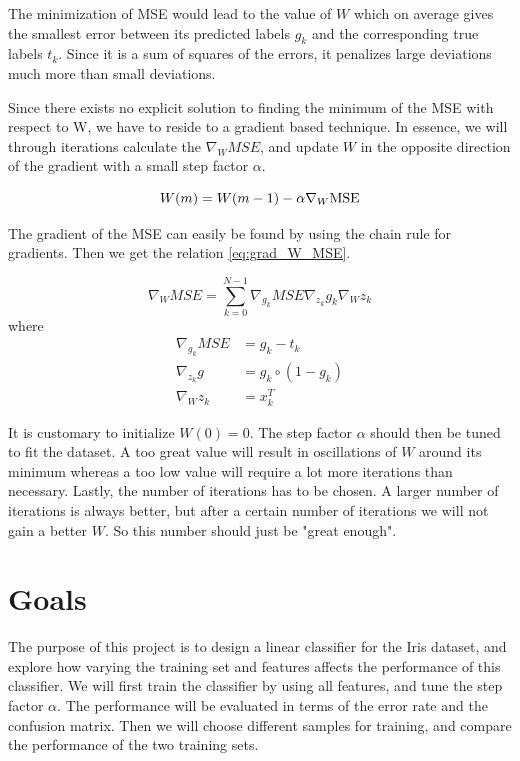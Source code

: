 \documentclass{article}
\begin{document}
The minimization of MSE would lead to the value of $W$ which on average gives the smallest error
between its predicted labels $g_k$ and the corresponding true labels $t_k$. Since it is a sum of
squares of the errors, it penalizes large deviations much more than small deviations.

Since there exists no explicit solution to finding the minimum of the MSE with respect to W,
we have to reside to a gradient based technique. In essence, we will through iterations calculate
the $\nabla_W MSE$, and update $W$ in the opposite direction of the gradient with a
small step factor $\alpha$.

\begin{equation}
    W(m) = W(m-1) - \alpha \nabla_W\textnormal{MSE} \label{eq:W_iteration}
\end{equation}

The gradient of the MSE can easily be found by using the chain rule for gradients. Then we get the
relation \eqref{eq:grad_W_MSE}.

\begin{equation}
    \nabla_WMSE = \sum_{k=0}^{N-1} \nabla_{g_k} MSE \nabla_{z_k} g_k \nabla_W z_k \label{eq:grad_W_MSE}
\end{equation}
where
\begin{align*}
    \nabla_{g_{k}} M S E &=g_{k}-t_{k} \\
    \nabla_{z_{k}} g &=g_{k} \circ\left(1-g_{k}\right) \\
    \nabla_{W} z_{k} &=x_{k}^{T}
\end{align*}

It is customary to initialize $W(0) = 0$. The step factor $\alpha$ should then be tuned to fit the dataset.
A too great value will result in oscillations of $W$ around its minimum whereas a too low value will
require a lot more iterations than necessary. Lastly, the number of iterations has to be chosen.
A larger number of iterations is always better, but after a certain number of iterations we will
not gain a better $W$. So this number should just be "great enough".

\section{Goals}\label{sec:purpose}

The purpose of this project is to design a linear classifier for the Iris dataset,
and explore how varying the training set and features affects the performance of
this classifier. We will first train the classifier by using all features, and tune
the step factor $\alpha$. The performance will be evaluated in terms of the error
rate and the confusion matrix. Then we will choose different samples for training,
and compare the performance of the two training sets.
\end{document}
